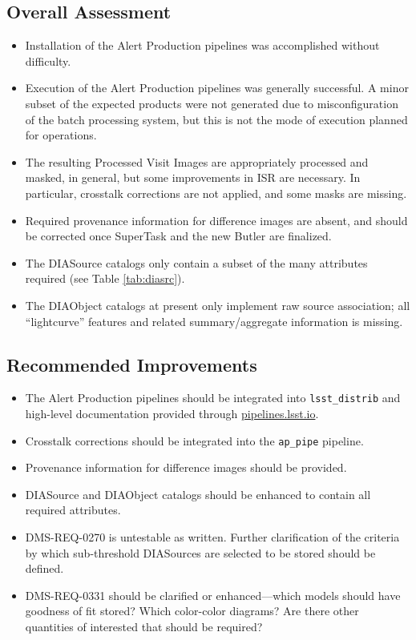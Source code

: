 \documentclass[DM,lsstdraft,STR,toc]{lsstdoc}
\begin{document}
\subsection{Overall Assessment \label{sect:overallassessment}}

\begin{itemize}
    \item Installation of the Alert Production pipelines was accomplished without difficulty.
    \item Execution of the Alert Production pipelines was generally successful.
    A minor subset of the expected products were not generated due to misconfiguration of the batch processing system, but this is not the mode of execution planned for operations.
    \item The resulting Processed Visit Images are appropriately processed and masked, in general, but some improvements in ISR are necessary. In particular, crosstalk corrections are not applied, and some masks are missing.
    \item Required provenance information for difference images are absent, and should be corrected once SuperTask and the new Butler are finalized.
    \item The DIASource catalogs only contain a subset of the many attributes required (see Table \ref{tab:diasrc}).
    \item The DIAObject catalogs at present only implement raw source association; all ``lightcurve'' features and related summary/aggregate information is missing.
\end{itemize}

\subsection{Recommended Improvements}
\label{sect:recommendations}

\begin{itemize}

    \item{The Alert Production pipelines should be integrated into \texttt{lsst\_distrib} and high-level documentation provided through \url{pipelines.lsst.io}.}
    \item{Crosstalk corrections should be integrated into the \texttt{ap\_pipe} pipeline.}
    \item{Provenance information for difference images should be provided.}
    \item{DIASource and DIAObject catalogs should be enhanced to contain all required attributes.}
    \item{DMS-REQ-0270 is untestable as written.
        Further clarification of the criteria by which sub-threshold
        DIASources are selected to be stored should be defined.}
    \item{DMS-REQ-0331 should be clarified or enhanced---which models should have goodness of fit stored?  Which color-color diagrams?  Are there other quantities of interested that should be required?}

\end{itemize}
\end{document}
